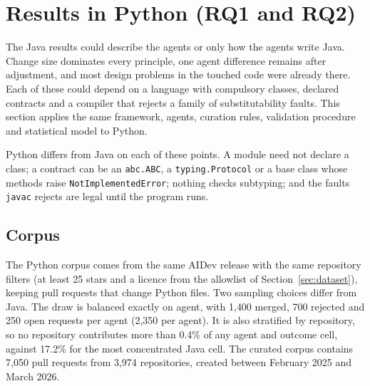 
\section{Results in Python (RQ1 and RQ2)}
\label{sec:python}

The Java results could describe the agents or only how the agents write Java. Change size dominates
every principle, one agent difference remains after adjustment, and most design problems in the
touched code were already there. Each of these could depend on a language with compulsory classes,
declared contracts and a compiler that rejects a family of substitutability faults. This section
applies the same framework, agents, curation rules, validation procedure and statistical model to
Python.

Python differs from Java on each of these points. A module need not declare a class; a contract can
be an \texttt{abc.ABC}, a \texttt{typing.Protocol} or a base class whose methods raise
\texttt{NotImplementedError}; nothing checks subtyping; and the faults \texttt{javac} rejects are
legal until the program runs.

\subsection{Corpus}
\label{sec:python-corpus}

The Python corpus comes from the same AIDev release with the same repository filters (at least 25
stars and a licence from the allowlist of Section~\ref{sec:dataset}), keeping pull requests that
change Python files. Two sampling choices differ from Java. The draw is balanced exactly on agent, with
1{,}400 merged, 700 rejected and 250 open requests per agent (2{,}350 per agent). It is
also stratified by repository, so no repository contributes more than 0.4\% of any agent and outcome
cell, against 17.2\% for the most concentrated Java cell. The curated corpus contains 7{,}050 pull
requests from 3{,}974 repositories, created between February 2025 and March 2026.

